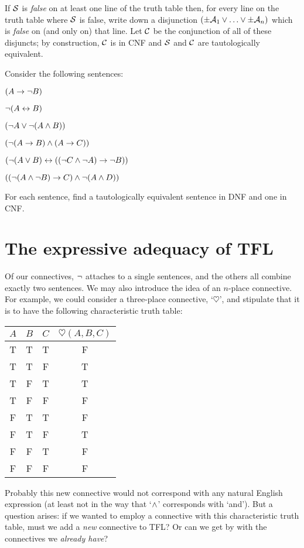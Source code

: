 	If $\mathcal{S}$ is \emph{false} on at least one line of the truth table then, for every line on the truth table where $\mathcal{S}$ is false, write down a disjunction $(\pm\mathcal{A}_1 \vee \ldots \vee \pm\mathcal{A}_n)$ which is \emph{false} on (and only on) that line. Let $\mathcal{C}$ be the conjunction of all of these disjuncts; by construction, $\mathcal{C}$ is in CNF and $\mathcal{S}$ and $\mathcal{C}$ are tautologically equivalent.

\practiceproblems
\problempart
\label{pr.DNF}
Consider the following sentences:
	\begin{earg}
		\item $(A \rightarrow \neg B)$
		\item $\neg (A \leftrightarrow B)$
		\item $(\neg A \vee \neg (A \wedge B))$
		\item $(\neg (A \rightarrow B ) \wedge (A \rightarrow C))$
		\item $(\neg (A \vee B) \leftrightarrow ((\neg C \wedge \neg A) \rightarrow \neg B))$
		\item $((\neg (A \wedge \neg B) \rightarrow C) \wedge \neg (A \wedge D))$
	\end{earg}
        For each sentence, find a tautologically equivalent sentence in DNF and one in CNF.
        
\section{The expressive adequacy of TFL}

Of our connectives, $\neg$ attaches to a single sentences, and the others all combine exactly two sentences. We may also introduce the idea of an $n$-place connective. For example, we could consider a three-place connective, `$\heartsuit$', and stipulate that it is to have the following characteristic truth table:
\begin{center}
\begin{tabular}{c c c | c}
$A$ & $B$ & $C$ & $\heartsuit(A,B,C)$\\
\hline
 T & T & T & F \\
 T & T & F & T \\
 T & F & T & T \\
 T & F & F & F \\
 F & T & T & F \\
 F & T & F & T \\
 F & F & T & F \\
 F & F & F & F
\end{tabular}
\end{center}
Probably this new connective would not correspond with any natural English expression (at least not in the way that `$\wedge$' corresponds with `and'). But a question arises: if we wanted to employ a connective with this characteristic truth table, must we add a \emph{new} connective to TFL? Or can we get by with the connectives we \emph{already have}?

